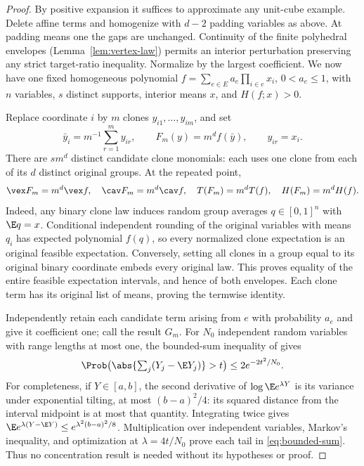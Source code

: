 \begin{proof}
By positive expansion it suffices to approximate any unit-cube example.
Delete affine terms and homogenize with $d-2$ padding variables as above.
At padding means one the gaps are unchanged. Continuity of the finite
polyhedral envelopes (Lemma~\ref{lem:vertex-law}) permits an interior
perturbation preserving any strict target-ratio inequality. Normalize by
the largest coefficient. We now have one fixed homogeneous polynomial
$f=\sum_{e\in E}a_e\prod_{i\in e}x_i$, $0<a_e\le1$, with $n$ variables,
$s$ distinct supports, interior means $x$, and $H(f;x)>0$.

Replace coordinate $i$ by $m$ clones $y_{i1},\ldots,y_{im}$, and set
\[
 \bar y_i=m^{-1}\sum_{r=1}^my_{ir},\qquad F_m(y)=m^df(\bar y),
 \qquad y_{ir}=x_i.
\]
There are $sm^d$ distinct candidate clone monomials: each uses one clone
from each of its $d$ distinct original groups. At the repeated point,
\begin{equation}\label{eq:clone-envelopes}
 \vex F_m=m^d\vex f,\quad \cav F_m=m^d\cav f,\quad
 T(F_m)=m^dT(f),\quad H(F_m)=m^dH(f).
\end{equation}
Indeed, any binary clone law induces random group averages $q\in[0,1]^n$
with $\E q=x$. Conditional independent rounding of the original variables
with means $q_i$ has expected polynomial $f(q)$, so every normalized clone
expectation is an original feasible expectation. Conversely, setting all
clones in a group equal to its original binary coordinate embeds every
original law. This proves equality of the entire feasible expectation
intervals, and hence of both envelopes. Each clone term has its original
list of means, proving the termwise identity.

Independently retain each candidate term arising from $e$ with probability
$a_e$ and give it coefficient one; call the result $G_m$. For $N_0$
independent random variables with range lengths at most one, the bounded-sum
inequality of \citet[Theorem~2]{Hoeffding1963} gives
\begin{equation}\label{eq:bounded-sum}
 \Prob\bigl(\abs{\textstyle\sum_j(Y_j-\E Y_j)}>t\bigr)
 \le2e^{-2t^2/N_0}.
\end{equation}
For completeness, if $Y\in[a,b]$, the second derivative of
$\log\E e^{\lambda Y}$ is its variance under exponential tilting, at most
$(b-a)^2/4$: its squared distance from the interval midpoint is at most
that quantity. Integrating twice gives
$\E e^{\lambda(Y-\E Y)}\le e^{\lambda^2(b-a)^2/8}$.
Multiplication over independent variables, Markov's inequality, and
optimization at $\lambda=4t/N_0$ prove each tail in
\eqref{eq:bounded-sum}. Thus no concentration result is needed without
its hypotheses or proof.


\end{proof}
